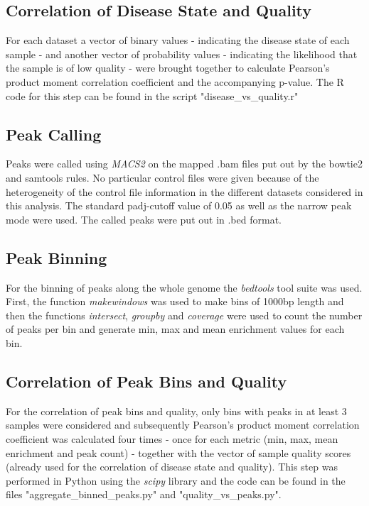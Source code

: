 \documentclass[5p]{elsarticle}
\begin{document}
\subsection{Correlation of Disease State and Quality}
For each dataset a vector of binary values - indicating the disease state of each sample - and another vector of probability values - indicating the likelihood that the sample is of low quality - were brought together to calculate Pearson's product moment correlation coefficient and the accompanying p-value. The R code for this step can be found in the script "disease\_vs\_quality.r"

\subsection{Peak Calling}
Peaks were called using \textit{MACS2} on the mapped .bam files put out by the bowtie2 and samtools rules. No particular control files were given because of the heterogeneity of the control file information in the different datasets considered in this analysis. The standard padj-cutoff value of 0.05 as well as the narrow peak mode were used. The called peaks were put out in .bed format.

\subsection{Peak Binning}
For the binning of peaks along the whole genome the \textit{bedtools} tool suite \cite{quinlan_bedtools_2010} was used. First, the function \textit{makewindows} was used to make bins of 1000bp length and then the functions \textit{intersect}, \textit{groupby} and \textit{coverage} were used to count the number of peaks per bin and generate min, max and mean enrichment values for each bin.

\subsection{Correlation of Peak Bins and Quality}
For the correlation of peak bins and quality, only bins with peaks in at least 3 samples were considered and subsequently Pearson's product moment correlation coefficient was calculated four times - once for each metric (min, max, mean enrichment and peak count) - together with the vector of sample quality scores (already used for the correlation of disease state and quality). This step was performed in Python using the \textit{scipy} library and the code can be found in the files "aggregate\_binned\_peaks.py" and "quality\_vs\_peaks.py".
\end{document}
